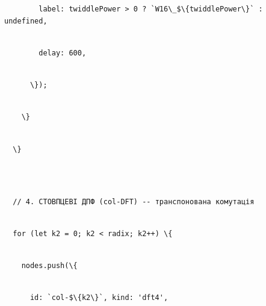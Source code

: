 \documentclass[
]{article}
\newcommand{\passthrough}[1]{#1}
\begin{document}
\passthrough{\lstinline!        !}\passthrough{\lstinline!label:!}\passthrough{\lstinline! !}\passthrough{\lstinline!twiddlePower!}\passthrough{\lstinline! !}\passthrough{\lstinline!>!}\passthrough{\lstinline! !}\passthrough{\lstinline!0!}\passthrough{\lstinline! !}\passthrough{\lstinline!?!}\passthrough{\lstinline! !}\passthrough{\lstinline!`W16\_$\{!}\passthrough{\lstinline!twiddlePower!}\passthrough{\lstinline!\}`!}\passthrough{\lstinline! !}\passthrough{\lstinline!:!}\passthrough{\lstinline! !}\passthrough{\lstinline!undefined,!}\strut \\
\passthrough{\lstinline!        !}\passthrough{\lstinline!delay:!}\passthrough{\lstinline! !}\passthrough{\lstinline!600,!}\strut \\
\passthrough{\lstinline!      !}\passthrough{\lstinline!\});!}\strut \\
\passthrough{\lstinline!    !}\passthrough{\lstinline!\}!}\strut \\
\passthrough{\lstinline!  !}\passthrough{\lstinline!\}!}\strut \\
\strut \\
\passthrough{\lstinline!  !}\passthrough{\lstinline!//!}\passthrough{\lstinline! !}\passthrough{\lstinline!4.!}\passthrough{\lstinline! !}\passthrough{\lstinline!СТОВПЦЕВІ!}\passthrough{\lstinline! !}\passthrough{\lstinline!ДПФ!}\passthrough{\lstinline! !}\passthrough{\lstinline!(col-DFT)!}\passthrough{\lstinline! !}\passthrough{\lstinline!--!}\passthrough{\lstinline! !}\passthrough{\lstinline!транспонована!}\passthrough{\lstinline! !}\passthrough{\lstinline!комутація!}\strut \\
\passthrough{\lstinline!  !}\passthrough{\lstinline!for!}\passthrough{\lstinline! !}\passthrough{\lstinline!(let!}\passthrough{\lstinline! !}\passthrough{\lstinline!k2!}\passthrough{\lstinline! !}\passthrough{\lstinline!=!}\passthrough{\lstinline! !}\passthrough{\lstinline!0;!}\passthrough{\lstinline! !}\passthrough{\lstinline!k2!}\passthrough{\lstinline! !}\passthrough{\lstinline!<!}\passthrough{\lstinline! !}\passthrough{\lstinline!radix;!}\passthrough{\lstinline! !}\passthrough{\lstinline!k2++)!}\passthrough{\lstinline! !}\passthrough{\lstinline!\{!}\strut \\
\passthrough{\lstinline!    !}\passthrough{\lstinline!nodes.push!}\passthrough{\lstinline!(\{!}\strut \\
\passthrough{\lstinline!      !}\passthrough{\lstinline!id:!}\passthrough{\lstinline! !}\passthrough{\lstinline!`col-$\{k2\}`,!}\passthrough{\lstinline! !}\passthrough{\lstinline!kind:!}\passthrough{\lstinline! !}\passthrough{\lstinline!'dft4',!}\strut \\
\end{document}
